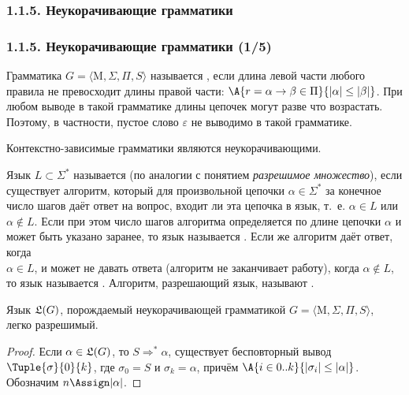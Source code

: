 \subsubsection{1.1.5. Неукорачивающие грамматики}
\label{1.1.5.}
\begin{frame}
\frametitle{1.1.5. Неукорачивающие грамматики (1/5)}

Грамматика $G=\langle \mathrm{M}, \Sigma, \Pi, S\rangle$ называется
, если
длина левой части любого правила не превосходит
длины правой части:
$\A{r=\alpha\rightarrow\beta\in \Pi}{|\alpha|\leq|\beta|}$. При
любом выводе в такой грамматике длины цепочек могут разве что
возрастать. Поэтому, в частности, пустое слово $\varepsilon$ не
выводимо в такой грамматике.
\begin{example}
Контекстно-зависимые грамматики являются неукорачивающими.
\end{example}

Язык $L\subset \Sigma^*$ называется
(по аналогии с понятием {\em разрешимое множество}), если существует
алгоритм, который для произвольной цепочки $\alpha\in \Sigma^*$ за
конечное число шагов даёт ответ на вопрос, входит ли эта цепочка в
язык, т.~е. $\alpha\in L$ или $\alpha\not\in L$. Если при этом число шагов алгоритма определяется по длине цепочки
$\alpha$ и может быть указано заранее, то язык называется
.
Если же алгоритм даёт ответ, когда \\$\alpha \in L$, и может не давать ответа (алгоритм не заканчивает работу),
когда $\alpha\not\in L$, то язык называется
.
Алгоритм, разрешающий язык, называют  . 

\begin{theorem}
Язык $\frak{L}(G)$, порождаемый неукорачивающей грамматикой
 $G=\langle \mathrm{M}, \Sigma, \Pi, S\rangle$, \\легко разрешимый.
\end{theorem}
\begin{proof}
Если $\alpha\in \frak{L}(G)$, то $S\Rightarrow^*\alpha$, существует бесповторный вывод $\Tuple{\sigma}{0}{k}$,
где $\sigma_0 = S$ и
$\sigma_k=\alpha$, причём 
 $\A{i\in 0..k}{|\sigma_i|\leq|\alpha|}$. Обозначим $n\Assign|\alpha|$.
\end{proof}
\end{frame}

